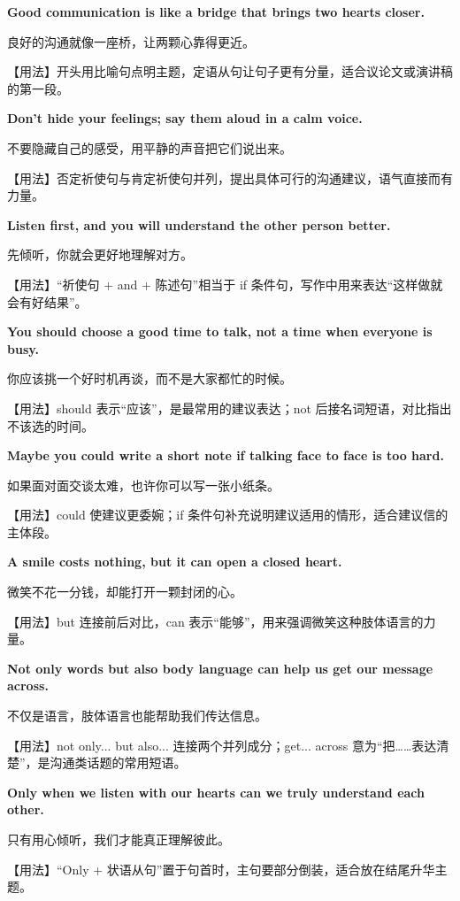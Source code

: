 \documentclass[UTF8,a4paper,11pt,oneside]{ctexbook}
\newcommand{\fansection}[1]{%
  \par\addvspace{2.4ex}%
  \Needspace{6\baselineskip}%
  \noindent{\sffamily\Large\bfseries\color{mainblue}#1}\par
  \nopagebreak
  \addvspace{0.2ex}%
  \noindent{\color{rulelight}\rule{\linewidth}{0.9pt}}\par
  \addvspace{0.9ex}%
  \nobreak
}
\newcommand{\fanpat}[3]{%
  \item{\bfseries #1}\par\nopagebreak
  {\small\color{textgray}#2}\par\nopagebreak
  {\footnotesize\color{accent!90!black}【用法】#3}\par
}
\begin{document}
\fansection{〇、本单元写作常用句型}
\begin{fanpatterns}
\fanpat{Good communication is like a bridge that brings two hearts closer.}{良好的沟通就像一座桥，让两颗心靠得更近。}{开头用比喻句点明主题，定语从句让句子更有分量，适合议论文或演讲稿的第一段。}

\fanpat{Don't hide your feelings; say them aloud in a calm voice.}{不要隐藏自己的感受，用平静的声音把它们说出来。}{否定祈使句与肯定祈使句并列，提出具体可行的沟通建议，语气直接而有力量。}

\fanpat{Listen first, and you will understand the other person better.}{先倾听，你就会更好地理解对方。}{“祈使句 + and + 陈述句”相当于 if 条件句，写作中用来表达“这样做就会有好结果”。}

\fanpat{You should choose a good time to talk, not a time when everyone is busy.}{你应该挑一个好时机再谈，而不是大家都忙的时候。}{should 表示“应该”，是最常用的建议表达；not 后接名词短语，对比指出不该选的时间。}

\fanpat{Maybe you could write a short note if talking face to face is too hard.}{如果面对面交谈太难，也许你可以写一张小纸条。}{could 使建议更委婉；if 条件句补充说明建议适用的情形，适合建议信的主体段。}

\fanpat{A smile costs nothing, but it can open a closed heart.}{微笑不花一分钱，却能打开一颗封闭的心。}{but 连接前后对比，can 表示“能够”，用来强调微笑这种肢体语言的力量。}

\fanpat{Not only words but also body language can help us get our message across.}{不仅是语言，肢体语言也能帮助我们传达信息。}{not only... but also... 连接两个并列成分；get... across 意为“把……表达清楚”，是沟通类话题的常用短语。}

\fanpat{Only when we listen with our hearts can we truly understand each other.}{只有用心倾听，我们才能真正理解彼此。}{“Only + 状语从句”置于句首时，主句要部分倒装，适合放在结尾升华主题。}

\end{fanpatterns}

\fansection{一、满分范文}
\end{document}
